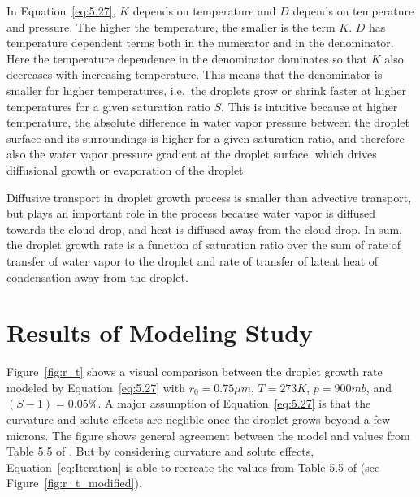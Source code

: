 \documentclass[]{article}
\begin{document}
In Equation~\eqref{eq:5.27}, $K$ depends on temperature and $D$
depends on temperature and pressure. The higher the temperature, the smaller is
the term $K$. $D$ has temperature dependent terms both in the numerator and in
the denominator. Here the temperature dependence in the denominator dominates
so that $K$ also decreases with increasing temperature. This means that the
denominator is smaller for higher temperatures, i.e.\ the droplets grow or
shrink faster at higher temperatures for a given saturation ratio $S$. This is
intuitive because at higher temperature, the absolute difference in water vapor
pressure between the droplet surface and its surroundings is higher for a given
saturation ratio, and therefore also the water vapor pressure gradient at the droplet
surface, which drives diffusional growth or evaporation of the droplet.

Diffusive transport in droplet growth process is smaller than advective
transport, but plays an important role in the process because water vapor is
diffused towards the cloud drop, and heat is diffused away from the cloud drop.
In sum, the droplet growth rate is a function of saturation ratio over the sum
of rate of transfer of water vapor to the droplet and rate of transfer of
latent heat of condensation away from the droplet.


\section{Results of Modeling Study}
Figure~\ref{fig:r_t} shows a visual comparison between the droplet growth rate
modeled by Equation~\eqref{eq:5.27} with $r_0 = 0.75 \mu m$, $T=273 K$, $p=900
mb$, and $(S - 1) = 0.05\%$. A major assumption of Equation~\eqref{eq:5.27} is
that the curvature and solute effects are neglible once the droplet grows
beyond a few microns. The figure shows general agreement between the model and
values from Table 5.5 of \cite{Curry}. But by considering curvature and solute
effects, Equation~\eqref{eq:Iteration} is able to recreate the values from
Table 5.5 of \cite{Curry} (see Figure~\ref{fig:r_t_modified}).
\end{document}
